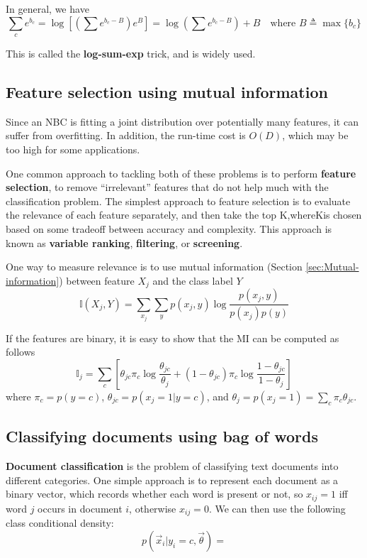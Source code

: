 In general, we have
\begin{equation}
\sum\limits_{c}e^{b_{c}}=\log\left[(\sum e^{b_c-B})e^B\right]=\log\left(\sum e^{b_c-B}\right)+B \quad \text{where } B \triangleq \max\{b_c\}
\end{equation}

This is called the \textbf{log-sum-exp} trick, and is widely used. 


\subsection{Feature selection using mutual information}
Since an NBC is fitting a joint distribution over potentially many features, it can suffer from overfitting. In addition, the run-time cost is $O(D)$, which may be too high for some applications. 

One common approach to tackling both of these problems is to perform \textbf{feature selection}, to remove “irrelevant” features that do not help much with the classification problem. The simplest approach to feature selection is to evaluate the relevance of each feature separately, and then take the top K,whereKis chosen based on some tradeoff between accuracy and complexity. This approach is known as \textbf{variable ranking}, \textbf{filtering}, or \textbf{screening}.

One way to measure relevance is to use mutual information (Section \ref{sec:Mutual-information}) between feature $X_j$ and the class label $Y$
\begin{equation}
\mathbb{I}(X_j,Y)=\sum\limits_{x_j}{\sum\limits_{y}{p(x_j,y)\log \dfrac{p(x_j,y)}{p(x_j)p(y)}}}
\end{equation}

If the features are binary, it is easy to show that the MI can be computed as follows
\begin{equation}
\mathbb{I}_j = \sum\limits_c \left[\theta_{jc}\pi_c\log{\dfrac{\theta_{jc}}{\theta_j}}+(1-\theta_{jc})\pi_c\log{\dfrac{1-\theta_{jc}}{1-\theta_j}}\right]
\end{equation}
where $\pi_c=p(y=c)$, $\theta_{jc}=p(x_j=1|y=c)$, and $\theta_j=p(x_j=1)=\sum_{c} \pi_c\theta_{jc}$.


\subsection{Classifying documents using bag of words}
\textbf{Document classification} is the problem of classifying text documents into different categories. One simple approach is to represent each document as a binary vector, which records whether each word is present or not, so $x_{ij} =1$ iff word $j$ occurs in document $i$, otherwise $x_{ij}=0$. We can then use the following class conditional density:
\begin{equation}
p(\vec{x}_i|y_i=c,\vec{\theta})=
\end{equation}


